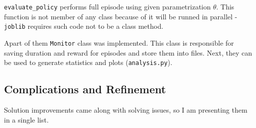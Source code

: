 \documentclass[12pt]{article}
\begin{document}
\texttt{evaluate\_policy} performs full episode using given parametrization $\theta$. This function is not member of any class because of it will be runned in parallel - \texttt{joblib} requires such code  not to be a class method.

Apart of them \texttt{Monitor} class was implemented. This class is responsible for saving duration and reward for episodes and store them into files. Next, they can be used to generate statistics and plots (\texttt{analysis.py}).

\subsection{Complications and Refinement}

Solution improvements came along with solving issues, so I am presenting them in a single list.
\end{document}

